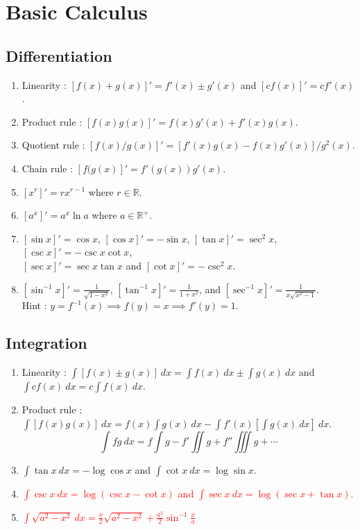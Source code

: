 \chapter{Basic Calculus}
\section{Differentiation}
\begin{enumerate}
	\item Linearity : $[f(x)+g(x)]' = f'(x) \pm g'(x)$ and $[cf(x)]' = cf'(x)$.
	\item Product rule : $[f(x)g(x)]' = f(x)g'(x) + f'(x)g(x)$.
	\item Quotient rule : $[f(x)/g(x)]' = [f'(x)g(x) - f(x)g'(x)]/g^2(x)$.
	\item Chain rule : $[f(g(x)]' = f'(g(x)) g'(x)$.
	\item $[x^r]' = rx^{r-1}$ where $r \in \mathbb{R}$.
	\item $[a^x]' = a^x \ln a$ where $a \in \mathbb{R}^+$.
	\item $[\sin x]' = \cos x$, $[\cos x]' = -\sin x$, $[\tan x]' = \sec^2 x$, $[\csc x]' = -\csc x \cot x$,\\ $[\sec x]' = \sec x \tan x$ and $[\cot x]' = -\csc^2 x$.
	\item $[\sin^{-1}x]' = \frac{1}{\sqrt{1-x^2}}$, $[\tan^{-1}x]' = \frac{1}{1+x^2}$, and $[\sec^{-1}x]' = \frac{1}{x\sqrt{x^2-1}}$.\\ Hint : $y = f^{-1}(x) \implies f(y) = x \implies f'(y) = 1$.
\end{enumerate}

\section{Integration}
\begin{enumerate}
	\item Linearity : $\int [f(x) \pm g(x)]\ dx = \int f(x)\ dx \pm \int g(x)\ dx$ and $\int cf(x)\ dx = c \int f(x)\ dx$.
	\item Product rule : $\int [f(x)g(x)]\ dx = f(x)\int g(x)\ dx - \int f'(x) \left[\int g(x)\ dx\right]\ dx$.
		{\color{blue}
		$$\int fg\ dx = f\int g - f'\iint g + f''\iiint g + \dotsb $$
		}
	\item $\int \tan x\ dx = -\log \cos x$ and $\int \cot x\ dx = \log \sin x$.
	\item \textcolor{red}{$\int \csc x\ dx = \log (\csc x - \cot x)$ and $\int \sec x\ dx = \log (\sec x + \tan x)$.}
	\item \textcolor{red}{$\int \sqrt{a^2 - x^2}\ dx = \frac{x}{2} \sqrt{a^2 - x^2} + \frac{a^2}{2} \sin^{-1} \frac{x}{a}$}
\end{enumerate}

